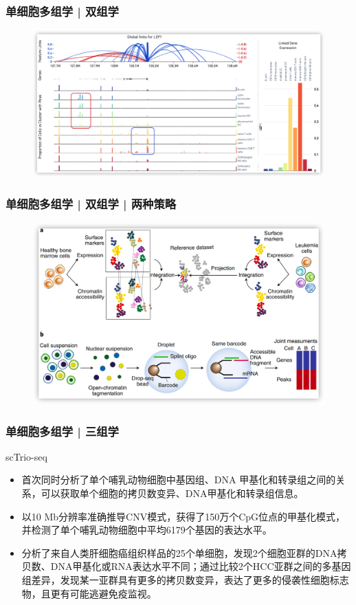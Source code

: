 \documentclass[11pt]{ctexbeamer}
\begin{document}
\begin{frame}
	\frametitle{单细胞多组学 | 双组学}
	\begin{figure}
		\includegraphics[width=\textwidth]{scRNA_scATAC_03.png}
	\end{figure}
\end{frame}

\begin{frame}
	\frametitle{单细胞多组学 | 双组学 | 两种策略}
	\begin{figure}
		\includegraphics[width=\textwidth]{scRNA_scATAC_05.png}
	\end{figure}
\end{frame}

\begin{frame}
		\frametitle{单细胞多组学 | 三组学}
			\begin{block}{scTrio-seq}
				\begin{itemize}
					\item 首次同时分析了单个哺乳动物细胞中基因组、DNA 甲基化和转录组之间的关系，可以获取单个细胞的拷贝数变异、DNA甲基化和转录组信息。
					\item 以10 Mb分辨率准确推导CNV模式，获得了150万个CpG位点的甲基化模式，并检测了单个哺乳动物细胞中平均6179个基因的表达水平。
					\item 分析了来自人类肝细胞癌组织样品的25个单细胞，发现2个细胞亚群的DNA拷贝数、DNA甲基化或RNA表达水平不同；通过比较2个HCC亚群之间的多基因组差异，发现某一亚群具有更多的拷贝数变异，表达了更多的侵袭性细胞标志物，且更有可能逃避免疫监视。
				\end{itemize}
		\end{block}
\end{frame}
\end{document}
